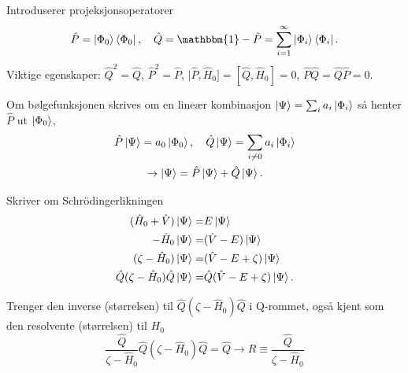 \documentclass{beamer}
\begin{document}
\begin{frame}
	Introduserer projeksjonsoperatorer
	\begin{equation}
		\hat P = \ket{\Phi_0}\bra{\Phi_0}, \quad \hat Q = \mathbbm{1} - \hat P = \sum_{i = 1}^{\infty} \ket{\Phi_i}\bra{\Phi_i}.
	\end{equation}
	Viktige egenskaper: $\hat Q^2 = \hat Q$, $\hat P^2 =  \hat P$, $|\hat P, \hat H_0] = [\hat Q, \hat H_0] = 0$, $\hat P \hat Q = \hat Q \hat P = 0$.

	Om bølgefunksjonen skrives om en lineær kombinasjon $\ket{\Psi} = \sum_i a_i \ket{\Phi_i}$ så henter $\hat P$ ut $\ket{\Phi_0}$,
	\begin{gather}
		\hat P \ket{\Psi} = a_0\ket{\Phi_0}, \quad \hat Q \ket{\Psi} = \sum_{i\neq 0} a_i \ket{\Phi_i}\\
		\rightarrow \ket{\Psi} = \hat P \ket{\Psi} + \hat Q \ket{\Psi}.
	\end{gather}

\end{frame}

\begin{frame}

	Skriver om Schrödingerlikningen
	\begin{align}
		(\hat H_0 + \hat V)\ket{\Psi} =& E\ket{\Psi} \\
		-\hat H_0\ket{\Psi} =& (\hat V - E)\ket{\Psi} \\
		(\zeta - \hat H_0)\ket{\Psi} =& (\hat V - E + \zeta) \ket{\Psi} \\
		\hat Q (\zeta - \hat H_0) \hat Q \ket{\Psi} =& \hat Q (\hat V - E + \zeta)\ket{\Psi}.
	\end{align}

	Trenger den inverse (størrelsen) til $\hat Q (\zeta - \hat H_0) \hat Q$ i Q-rommet, også kjent som den resolvente (størrelsen) til $H_0$
	\begin{equation}
	\frac{\hat Q}{\zeta - \hat H_0} \hat Q(\zeta - \hat H_0)\hat Q = \hat Q \rightarrow \hat R \equiv \frac{\hat Q}{\zeta - \hat H_0} 
	\end{equation}

\end{frame}
\end{document}
